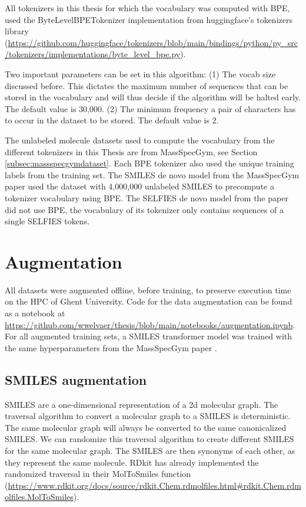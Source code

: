 All tokenizers in this thesis for which the vocabulary was computed with \acf{BPE}, used the ByteLevelBPETokenizer implementation from huggingface's tokenizers library (\url{https://github.com/huggingface/tokenizers/blob/main/bindings/python/py_src/tokenizers/implementations/byte_level_bpe.py}).

Two important parameters can be set in this algorithm:
(1) The vocab size discussed before. This dictates the maximum number of sequences that can be stored in the vocabulary and will thus decide if the algorithm will be halted early. The default value is 30,000.
(2) The minimum frequency a pair of characters has to occur in the dataset to be stored. The default value is 2.

The unlabeled molecule datasets used to compute the vocabulary from the different tokenizers in this Thesis are from MassSpecGym, see Section \ref{subsec:massspecgymdataset}.
Each \ac{BPE} tokenizer also used the unique training labels from the training set.
The SMILES de novo model from the MassSpecGym paper \cite{bushuiev2024massspecgym} used the dataset with 4,000,000 unlabeled SMILES to precompute a tokenizer vocabulary using \ac{BPE}.
The SELFIES de novo model from the paper did not use \ac{BPE}, the vocabulary of its tokenizer only contains sequences of a single SELFIES tokens.

\section{Augmentation}
\label{sec:augmentation}

All datasets were augmented offline, before training, to preserve execution time on the \ac{HPC} of Ghent University.
Code for the data augmentation can be found as a notebook at \url{https://github.com/wwelvaer/thesis/blob/main/notebooks/augmentation.ipynb}.
For all augmented training sets, a SMILES transformer model was trained with the same hyperparameters from the MassSpecGym paper \cite{bushuiev2024massspecgym}.

\subsection{SMILES augmentation}
\label{sec:smiles_augmentation}

SMILES are a one-dimensional representation of a 2d molecular graph.
The traversal algorithm to convert a molecular graph to a SMILES is deterministic.
The same molecular graph will always be converted to the same canonicalized SMILES.
We can randomize this traversal algorithm to create different SMILES for the same molecular graph.
The SMILES are then synonyms of each other, as they represent the same molecule.
RDkit has already implemented the randomized traversal in their MolToSmiles function (\url{https://www.rdkit.org/docs/source/rdkit.Chem.rdmolfiles.html#rdkit.Chem.rdmolfiles.MolToSmiles}).

